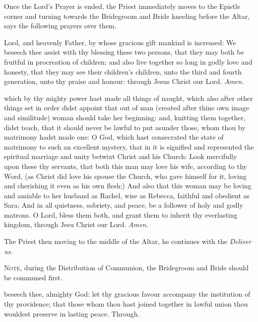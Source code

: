 \begin{rubric}
    Once the Lord's Prayer is ended, the Priest immediately moves to the Epistle corner and turning towards the Bridegroom and Bride kneeling before the Altar, says the following prayers over them.
\end{rubric}
 Lord, and heavenly Father, by whose gracious gift mankind is increased: We beseech thee assist with thy blessing these two persons, that they may both be fruitful in procreation of children; and also live together so long in godly love and honesty, that they may see their children's children, unto the third and fourth generation, unto thy praise and honour: through Jesus Christ our Lord. \textit{Amen.}\par
{} which by thy mighty power hast made all things of naught, which also after other things set in order didst appoint that out of man (created after thine own image and similitude) woman should take her beginning: and, knitting them together, didst teach, that it should never be lawful to put asunder those, whom thou by matrimony hadst made one: O God, which hast consecrated the state of matrimony to such an excellent mystery, that in it is signified and represented the spiritual marriage and unity betwixt Christ and his Church: Look mercifully upon these thy servants, that both this man may love his wife, according to thy Word, (as Christ did love his spouse the Church, who gave himself for it, loving and cherishing it even as his own flesh;) And also that this woman may be loving and amiable to her husband as Rachel, wise as Rebecca, faithful and obedient as Sara; And in all quietness, sobriety, and peace, be a follower of holy and godly matrons. O Lord, bless them both, and grant them to inherit thy everlasting kingdom, through Jesu Christ our Lord. \textit{Amen.}

\begin{rubric}
    The Priest then moving to the middle of the Altar, he continues with the \emph{Deliver us}.\par
    \textsc{Note,} during the Distribution of Communion, the Bridegroom and Bride should be communed first.
\end{rubric}


 beseech thee, almighty God: let thy gracious favour accompany the institution of thy providence; that those whom thou hast joined together in lawful union thou wouldest preserve in lasting peace. Through.

